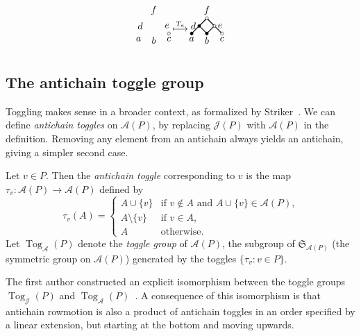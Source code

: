 \documentclass[ALCO,ThmDefs,Unicode,epreuves]{cedram}
\newcommand{\defn}[1]{\emph{#1}}
\newcommand{\ra}{\rightarrow}
\newcommand{\sm}{\setminus}
\DeclareMathOperator{\tog}{Tog}
\newcommand{\cala}{\mathcal{A}}
\newcommand{\calj}{\mathcal{J}}
\begin{document}
\begin{exam}
\[\begin{tikzpicture}[scale=.274]
\begin{scope}[shift={(35,-4)}]
\draw (2,0) circle [radius=0.2];
\node[above] at (0,2) {$f$};
\node[left] at (-1,1) {$d$};
\node[right] at (1,1) {$e$};
\node[below] at (-2,0) {$a$};
\node[below] at (0,0) {$b$};
\node[below] at (2,0) {$c$};
\end{scope}
\node at (38.5,-3) {$\stackrel{T_a}{\longmapsto}$};
\begin{scope}[shift={(42,-4)}]
\draw[thick] (-0.1, 1.9) -- (-0.9, 1.1);
\draw[thick] (0.1, 1.9) -- (0.9, 1.1);
\draw[thick] (-1.1, 0.9) -- (-1.9, 0.1);
\draw[thick] (-0.9, 0.9) -- (-0.1, 0.1);
\draw[thick] (0.9, 0.9) -- (0.1, 0.1);
\draw[thick] (1.1, 0.9) -- (1.9, 0.1);
\draw (0,2) circle [radius=0.2];
\draw[fill] (-1,1) circle [radius=0.2];
\draw (1,1) circle [radius=0.2];
\draw[fill] (-2,0) circle [radius=0.2];
\draw[fill] (0,0) circle [radius=0.2];
\draw (2,0) circle [radius=0.2];
\node[above] at (0,2) {$f$};
\node[left] at (-1,1) {$d$};
\node[right] at (1,1) {$e$};
\node[below] at (-2,0) {$a$};
\node[below] at (0,0) {$b$};
\node[below] at (2,0) {$c$};
\end{scope}
\end{tikzpicture}
\]
\end{exam}

\subsection{The antichain toggle group}
Toggling makes sense in a broader context, as formalized by Striker~\cite{strikergentog}. We can define \emph{antichain toggles} on $\cala(P)$, by replacing $\calj(P)$ with $\cala(P)$ in the definition. Removing any element from an antichain always yields an antichain, giving a simpler second case. 
\begin{defi}\label{def:comb-tau}
Let $v\in P$. Then the \defn{antichain toggle} corresponding to $v$ is the map $\tau_v: \cala(P)\ra \cala(P)$
defined by
\[
\tau_v(A)=\begin{cases}
A\cup\{v\} &\text{if $v\not\in A$ and $A\cup\{v\}\in\cala(P)$,}\\
A\sm\{v\} &\text{if $v\in A$,}\\
A &\text{otherwise.}
\end{cases}
\]
Let $\tog_\cala(P)$ denote the \defn{toggle group} of $\cala(P)$, \ie the subgroup of
$\mathfrak{S}_{\cala (P)}$ (the symmetric group on $\cala (P)$) generated by the toggles $\{\tau_v : v\in P\}$.
\end{defi}
The first author constructed an explicit isomorphism between the toggle groups $\tog_\calj(P)$ and
$\tog_\cala(P)$~\cite{antichain-toggling}.
A consequence of this isomorphism is that antichain rowmotion is also a product of antichain toggles in an order specified by a linear extension, but starting at the bottom and moving upwards.
\end{document}
